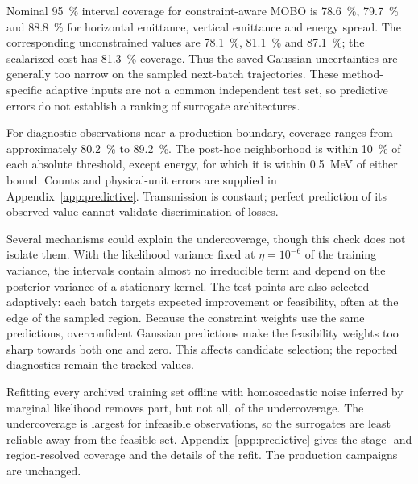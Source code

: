 \documentclass[aps,prab,reprint,superscriptaddress,amsmath,amssymb,floatfix]{revtex4-2}
\begin{document}
Nominal \SI{95}{\percent} interval coverage for constraint-aware MOBO is
\SI{78.6}{\percent}, \SI{79.7}{\percent} and \SI{88.8}{\percent} for horizontal
emittance, vertical emittance and energy spread. The corresponding unconstrained values
are \SI{78.1}{\percent}, \SI{81.1}{\percent} and \SI{87.1}{\percent}; the scalarized
cost has \SI{81.3}{\percent} coverage. Thus the saved Gaussian uncertainties are generally
too narrow on the sampled next-batch trajectories. These method-specific adaptive inputs
are not a common independent test set, so predictive errors do not establish a ranking
of surrogate architectures.

For diagnostic observations near a production boundary, coverage ranges from approximately
\SI{80.2}{\percent} to \SI{89.2}{\percent}. The post-hoc neighborhood is within
\SI{10}{\percent} of each absolute threshold, except energy, for which it is within
\SI{0.5}{\mega\electronvolt} of either bound. Counts and physical-unit errors are supplied
in Appendix~\ref{app:predictive}. Transmission is constant; perfect prediction of its
observed value cannot validate discrimination of losses.

Several mechanisms could explain the undercoverage, though this check does not isolate them.
With the likelihood variance fixed at $\eta=10^{-6}$ of the training variance, the intervals
contain almost no irreducible term and depend on the posterior variance of a stationary
kernel. The test points are also selected adaptively: each batch targets expected
improvement or feasibility, often at the edge of the sampled region. Because the constraint
weights use the same predictions, overconfident Gaussian predictions make the feasibility
weights too sharp towards both one and zero. This affects candidate selection; the reported
diagnostics remain the tracked values.

Refitting every archived training set offline with homoscedastic noise inferred by marginal
likelihood removes part, but not all, of the undercoverage. The undercoverage is largest for
infeasible observations, so the surrogates are
least reliable away from the feasible set. Appendix~\ref{app:predictive} gives the stage- and
region-resolved coverage and the details of the refit. The production campaigns are
unchanged.
\end{document}
